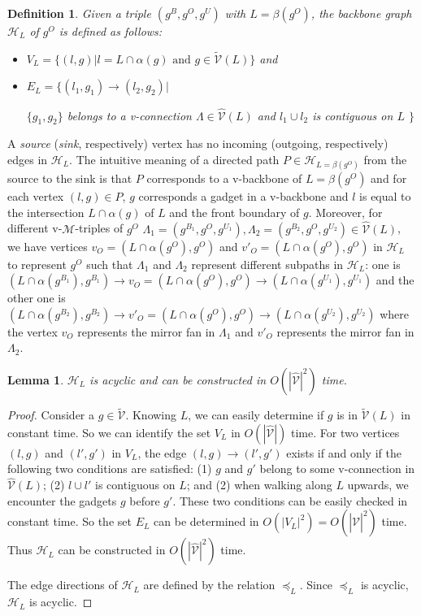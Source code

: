 \documentclass[11pt]{article}
\newcommand{\HH}{\mathcal{H}}
\newcommand{\MM}{\mathcal{M}}
\newcommand{\VV}{\mathcal{V}}
\newtheorem{definition}[figure]{Definition}
\newtheorem{lemma}[figure]{Lemma}
\begin{document}
\begin{definition}\label{gra:L}
Given a triple $(g^B, g^O, g^U)$ with $L=\beta(g^O)$,
the \emph{backbone graph} $\HH_L$ of $g^O$ is defined as follows:
\begin{itemize}

\item $V_L=\{(l, g)| l=L\cap \alpha(g) \mbox{ and }
g\in \tilde{\VV}(L) \}$ and

\item $E_L=\{(l_1, g_1)\rightarrow (l_2, g_2)| $

$\{g_1, g_2\}$
belongs to a v-connection $\Lambda\in \hat{\VV}(L)$ and
$l_1\cup l_2$ is contiguous on $L$ $\}$

\end{itemize}
\end{definition}
A \emph{source} (\emph{sink}, respectively) vertex
has no incoming (outgoing, respectively) edges in $\HH_L$.
The intuitive meaning of a directed path $P\in \HH_{L=\beta(g^O)}$
from the source to the sink
is that $P$ corresponds to a v-backbone of $L=\beta(g^O)$ and
for each vertex $(l, g) \in P$, $g$ corresponds a gadget in a v-backbone
and $l$ is equal to the intersection $L\cap \alpha(g)$ of $L$
and the front boundary of $g$.
Moreover, for different v-$\MM$-triples of $g^O$
$\Lambda_1=(g^{B_1}, g^O, g^{U_1}),
\Lambda_2=(g^{B_2}, g^O, g^{U_2})\in \hat{\VV}(L)$,
we have vertices $v_O=(L\cap \alpha(g^O), g^O)$ and $v'_O=(L\cap \alpha(g^O), g^O)$
in $\HH_L$ to represent $g^O$
such that $\Lambda_1$ and $\Lambda_2$ represent different subpaths in $\HH_L$:
one is
$(L\cap \alpha(g^{B_1}), g^{B_1})
\rightarrow v_O=(L\cap \alpha(g^O), g^O) \rightarrow (L\cap \alpha(g^{U_1}), g^{U_1})$
and the other one is
$(L\cap \alpha(g^{B_2}), g^{B_2})
\rightarrow v'_O=(L\cap \alpha(g^O), g^O) \rightarrow (L\cap \alpha(g^{U_2}), g^{U_2})$
where the vertex $v_O$ represents the mirror fan in $\Lambda_1$
and $v'_O$ represents the mirror fan in $\Lambda_2$.

\begin{lemma}\label{lemma:GL}
$\HH_L$ is acyclic and can be constructed in $O(|\hat{\VV}|^2)$ time.
\end{lemma}

\begin{proof}
Consider a $g \in \tilde{\VV}$. Knowing $L$, we can easily determine
if $g$ is in $\tilde{\VV}(L)$ in constant time. So we can identify
the set $V_L$ in $O(|\hat{\VV}|)$ time.
For two vertices $(l, g)$ and $(l', g')$ in $V_L$, the edge
$(l, g) \rightarrow (l', g')$ exists if and only if the following
two conditions are satisfied:
(1) $g$ and $g'$ belong to some v-connection in $\hat{\VV}(L)$;
(2) $l\cup l'$ is contiguous on $L$; and
(2) when walking along $L$ upwards, we encounter the gadgets $g$
before $g'$.
These two conditions can be easily checked in constant time.
So the set $E_L$ can be determined
in $O(|V_L|^2)=O(|\hat{\VV}|^2)$ time. Thus $\HH_L$ can be constructed
in $O(|\hat{\VV}|^2)$ time.

The edge directions of $\HH_L$ are defined by the relation $\preceq_L$.
Since $\preceq_L$ is acyclic, $\HH_L$ is acyclic.
\end{proof}
\end{document}
